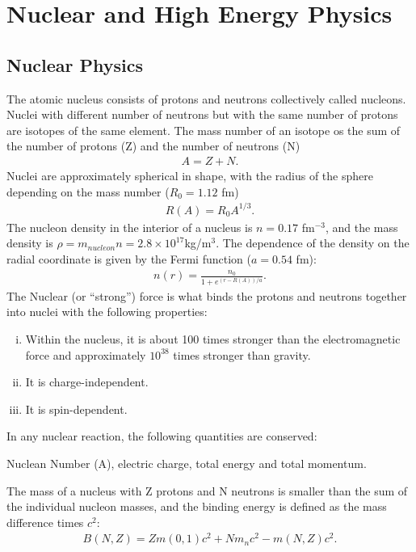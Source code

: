 \chapter{Nuclear and High Energy Physics}
\thispagestyle{fancy}
\section{Nuclear Physics}
The atomic nucleus consists of protons and neutrons collectively called nucleons. Nuclei with different number of neutrons but with the same number of protons are isotopes of the same element. The mass number of an isotope os the sum of the number of protons (Z) and the number of neutrons (N)
\begin{align}
A=Z+N.
\end{align}
Nuclei are approximately spherical in shape, with the radius of the sphere depending on the mass number ($R_0=1.12$ fm)
\begin{align}
R(A)=R_0A^{1/3}.
\end{align}
The nucleon density in the interior of a nucleus is $n=0.17$ fm$^{-3}$, and the mass density is $\rho=m_{nucleon}n=2.8\times 10^{17}$kg/m$^3$. The dependence of the density on the radial coordinate is given by the Fermi function ($a=0.54$ fm):
\begin{align}
n(r)=\frac{n_0}{1+e^{(r-R(A))/a}}.
\end{align}
The Nuclear (or ``strong'') force is what binds the protons and neutrons together into nuclei with the following properties:
\begin{enumerate}[(i)]
	\item Within the nucleus, it is about 100 times stronger than the electromagnetic force and approximately $10^{38}$ times stronger than gravity.
	\item It is charge-independent.
	\item It is spin-dependent.
\end{enumerate}
In any nuclear reaction, the following quantities are conserved: 
\begin{center}
	Nuclean Number (A), electric charge, total energy and total momentum.
\end{center}
The mass of a nucleus with Z protons and N neutrons is smaller than the sum of the individual nucleon masses, and the binding energy is defined as the mass difference times $c^2$:
\begin{align}
B(N,Z)=Zm(0,1)c^2+Nm_nc^2-m(N,Z)c^2.
\end{align}
